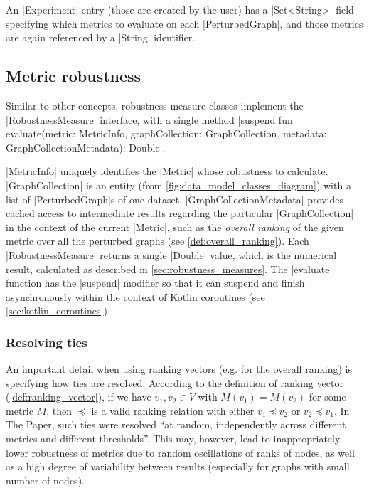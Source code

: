 An |Experiment| entry (those are created by the user) has a |Set<String>| field specifying which metrics to evaluate on each |PerturbedGraph|, and those metrics are again referenced by a |String| identifier.

\subsection{Metric robustness}

Similar to other concepts, robustness measure classes implement the |RobustnessMeasure| interface, with a single method |suspend fun evaluate(metric: MetricInfo, graphCollection: GraphCollection, metadata: GraphCollectionMetadata): Double|.

|MetricInfo| uniquely identifies the |Metric| whose robustness to calculate.
|GraphCollection| is an entity (from \autoref{fig:data_model_classes_diagram}) with a list of |PerturbedGraph|s of one dataset.
|GraphCollectionMetadata| provides cached\footnotemark{} access to intermediate results regarding the particular |GraphCollection| in the context of the current |Metric|, such as the \textsl{overall ranking} of the given metric over all the perturbed graphs (see \autoref{def:overall_ranking}).
Each |RobustnessMeasure| returns a single |Double| value, which is the numerical result, calculated as described in \autoref{sec:robustness_measures}.
The |evaluate| function has the |suspend| modifier so that it can suspend and finish asynchronously within the context of Kotlin coroutines (see \autoref{sec:kotlin_coroutines}).

\subsubsection*{Resolving ties}

An important detail when using ranking vectors (e.g. for the overall ranking) is specifying how ties are resolved.
According to the definition of ranking vector (\cref{def:ranking_vector}), if we have $v_1, v_2 \in V$ with $M(v_1) = M(v_2)$ for some metric $M$, then $\preceq$ is a valid ranking relation with either $v_1 \preceq v_2$ or $v_2 \preceq v_1$.
In The Paper, such ties were resolved \enquote{at random, independently across different metrics and different thresholds}.
This may, however, lead to inappropriately lower robustness of metrics due to random oscillations of ranks of nodes, as well as a high degree of variability between results (especially for graphs with small number of nodes).

